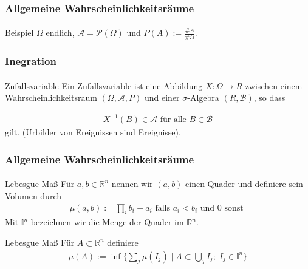 \documentclass{beamer}
\begin{document}
\begin{frame}
    \frametitle{Allgemeine Wahrscheinlichkeitsräume}
\framesubtitle{}

\begin{block}{Beispiel}
$\Omega$ endlich, $\mathcal{A} = \mathcal{P}(\Omega)$ und $P(A) := \frac{\#A}{\# \Omega}$.
\end{block}

 \end{frame}

\begin{frame}
    \frametitle{Inegration}
\framesubtitle{}

\begin{block}{Zufallsvariable}
Ein Zufallsvariable ist eine Abbildung $X : \Omega \to R$ zwischen einem Wahrscheinlichkeitsraum  $(\Omega, \mathcal{A}, P)$  und einer $\sigma$-Algebra $(R,  \mathcal{B} )$, so dass

\begin{align*}
X^{-1}(B) \in \mathcal{A} \text{ für alle } B \in  \mathcal{B}
\end{align*}
gilt. (Urbilder von Ereignissen sind Ereignisse).
\end{block}

 \end{frame}



\begin{frame}
    \frametitle{Allgemeine Wahrscheinlichkeitsräume}
\framesubtitle{}

\begin{block}{Lebesgue Maß}
Für $a, b \in \mathbb{R}^n$ nennen wir $(a,b)$ einen Quader  und definiere sein Volumen durch
\begin{align*}
\mu (a,b) :=  \prod_i  b_i - a_i  \text{ falls } a_i < b_i \text{ und } 0 \text{ sonst }  
\end{align*}
Mit $\mathbb{I}^n$ bezeichnen wir die Menge der Quader im $\mathbb{R}^n$.
\end{block}

\begin{block}{Lebesgue Maß}
Für $A \subset \mathbb{R}^n$ definiere 
\begin{align*}
\mu(A) :=  \inf \biggl \{ \sum_j \mu(I_j)  \; | \; A \subset \bigcup_j I_j; \; I_j \in \mathbb{I}^n  \biggr \}   
\end{align*}
\end{block}

 \end{frame}
\end{document}
